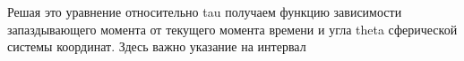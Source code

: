 \documentclass{article}
\begin{document}
\begin{Maple Normal}{
\begin{Maple Normal}{
}\end{Maple Normal}
}\end{Maple Normal}
\begin{Maple Normal}{
\begin{Maple Normal}{
Решая это уравнение относительно tau получаем функцию зависимости запаздывающего момента от текущего момента времени и угла theta сферической системы координат. Здесь важно указание на интервал}\end{Maple Normal}

}\end{Maple Normal}
\end{document}
